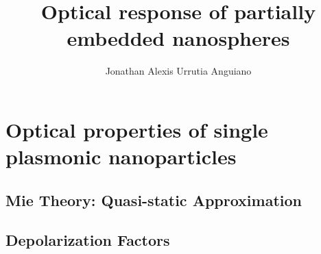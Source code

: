 \documentclass[11pt]{Latex/Classes/PhDthesisPSnPDF}
\author{Jonathan Alexis Urrutia Anguiano}
\title{Optical response of partially embedded nanospheres}
\begin{document}
%
\maketitle									
\frontmatter

%          
%
%                  
       

%
\setcounter{secnumdepth}{3} %
\setcounter{tocdepth}{3}    %

\tableofcontents            %



\mainmatter

\def\baselinestretch{1}                   %

            

\chapter{Optical properties of single plasmonic nanoparticles}
	\section{Mie Theory: Quasi-static Approximation}
	\section{Depolarization Factors}
\end{document}
